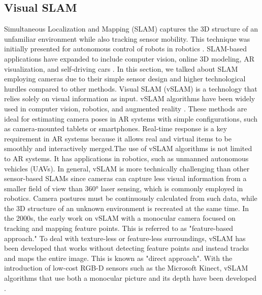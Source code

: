 \subsection{Visual SLAM}
Simultaneous Localization and Mapping (SLAM) captures the 3D structure of an unfamiliar environment while also tracking sensor mobility. This technique was initially presented for autonomous control of robots in robotics \cite{chatila1985position}. SLAM-based applications have expanded to include computer vision, online 3D modeling, AR visualization, and self-driving cars \cite{durrant2006simultaneous,bailey2006simultaneous, stachniss2016simultaneous,aulinas2008slam}. In this section, we talked about  SLAM employing cameras due to their simple sensor design and higher technological hurdles compared to other methods. Visual SLAM (vSLAM) is a technology that relies solely on visual information as input. vSLAM algorithms have been widely used in computer vision, robotics, and augmented reality \cite{billinghurst2015survey}. These methods are ideal for estimating camera poses in AR systems with simple configurations, such as camera-mounted tablets or smartphones. Real-time response is a key requirement in AR systems because it allows real and virtual items to be smoothly and interactively merged.The use of vSLAM algorithms is not limited to AR systems. It has applications in robotics, such as unmanned autonomous vehicles (UAVs). In general, vSLAM is more technically challenging than other sensor-based SLAMs since cameras can capture less visual information from a smaller field of view than 360° laser sensing, which is commonly employed in robotics. Camera postures must be continuously calculated from such data, while the 3D structure of an unknown environment is recreated at the same time. In the 2000s, the early work on vSLAM with a monocular camera focused on tracking and mapping feature points. This is referred to as "feature-based approach." To deal with texture-less or feature-less surroundings, vSLAM has been developed that works without detecting feature points and instead tracks and maps the entire image. This is known as "direct approach". With the introduction of low-cost RGB-D sensors such as the Microsoft Kinect, vSLAM algorithms that use both a monocular picture and its depth have been developed  \cite{Taketomi2017}. 
